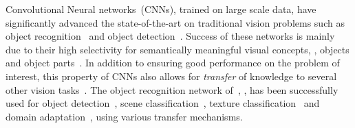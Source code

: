 \documentclass[10pt,twocolumn,letterpaper]{article}
\begin{document}
Convolutional Neural networks~(CNNs), trained on large scale data, have significantly advanced the state-of-the-art 
on traditional vision problems such as object recognition~\cite{Krizhevsky12a,Simonyan14a,Szegedy15a} and 
object detection~\cite{Girshick15a,Ren15a}. Success of these networks is mainly due to their high selectivity 
for semantically meaningful visual concepts, \eg, objects and object parts~\cite{Fergus14a}.
In addition to ensuring good performance on the problem of interest, this property of CNNs also allows 
for {\it transfer\/} of knowledge to several other vision tasks~\cite{Donahue14a,Gong14a,Cimpoi15a,Dixit15a}. 
The object recognition network of~\cite{Krizhevsky12a}, \eg, has been successfully used for object 
detection~\cite{Girshick15a,Ren15a}, scene classification~\cite{Gong14a,Dixit15a}, texture 
classification~\cite{Cimpoi15a} and domain adaptation~\cite{Donahue14a}, using various 
transfer mechanisms. 
\end{document}
